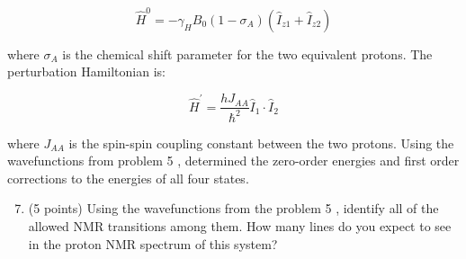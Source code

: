 \documentclass[12pt]{article}
\begin{document}
$$
\widehat{H}^{0}=-\gamma_{H} B_{0}\left(1-\sigma_{A}\right)\left(\hat{I}_{z 1}+\hat{I}_{z 2}\right)
$$

where $\sigma_{A}$ is the chemical shift parameter for the two equivalent protons. The perturbation Hamiltonian is:

$$
\widehat{H}^{\prime}=\frac{h J_{A A}}{\hbar^{2}} \hat{I}_{1} \cdot \hat{I}_{2}
$$

where $J_{A A}$ is the spin-spin coupling constant between the two protons. Using the wavefunctions from problem 5 , determined the zero-order energies and first order corrections to the energies of all four states.

\begin{enumerate}
  \setcounter{enumi}{6}
  \item (5 points) Using the wavefunctions from the problem 5 , identify all of the allowed NMR transitions among them. How many lines do you expect to see in the proton NMR spectrum of this system?
\end{enumerate}
\end{document}
